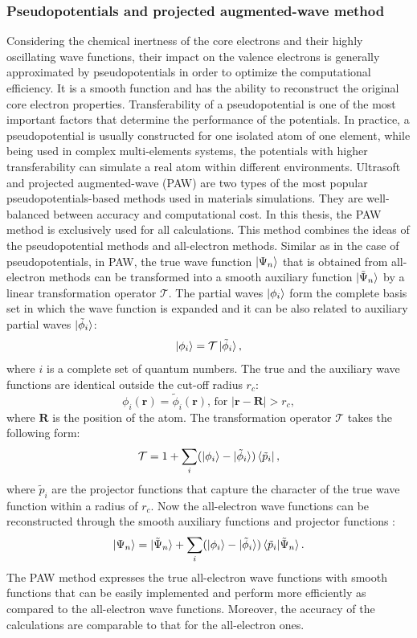 \subsubsection{Pseudopotentials and projected augmented-wave method}
Considering the chemical inertness of the core electrons and their highly oscillating wave functions, their impact on the valence electrons is generally approximated by pseudopotentials in order to optimize the computational efficiency. It is a smooth function and has the ability to reconstruct the original core electron properties. Transferability of a pseudopotential is one of the most important factors that determine the performance of the potentials. In practice, a pseudopotential is usually constructed for one isolated atom of one element, while being used in complex multi-elements systems, the potentials with higher transferability can simulate a real atom within different environments. Ultrasoft \cite{Ultrasoft1} and projected augmented-wave (PAW) \cite{PAW1,Kresse1999} are two types of the most popular pseudopotentials-based methods used in materials simulations. They are well-balanced between accuracy and computational cost. In this thesis, the PAW method is exclusively used for all calculations. This method combines the ideas of the pseudopotential methods and all-electron methods. Similar as in the case of pseudopotentials, in PAW, the true wave function $\ket{\Psi_n}$ that is obtained from all-electron methods can be transformed into a smooth auxiliary function $\ket{\tilde{\Psi}_n}$ by a linear transformation operator $\mathcal{T}$. The partial waves $\ket{\phi_i}$ form the complete basis set in which the wave function is expanded and it can be also related to auxiliary partial waves $\ket{\tilde{\phi}_i}$:
\begin{equation}
\ket{\phi_i}=\mathcal{T}\ket{\tilde{\phi}_i},
\end{equation}
where $i$ is a complete set of quantum numbers. The true and the auxiliary wave functions are identical outside the cut-off radius $r_c$:
\begin{equation}
\phi_i(\mathbf{r})=\tilde{\phi}_i(\mathbf{r})\text{, for }|\mathbf{r}-\mathbf{R}|>r_c,
\end{equation}
where $\mathbf{R}$ is the position of the atom. The transformation operator $\mathcal{T}$ takes the following form:
\begin{equation}
\mathcal{T}=1+\sum_i(\ket{\phi_i}-\ket{\tilde{\phi}_i})\bra{\tilde{p}_i},
\end{equation}
where $\tilde{p}_i$ are the projector functions that capture the character of the true wave function within a radius of $r_c$. Now the all-electron wave functions can be reconstructed through the smooth auxiliary functions and projector functions :
\begin{equation}
\ket{\Psi_n}=\ket{\tilde{\Psi}_n}+\sum_i(\ket{\phi_i}-\ket{\tilde{\phi}_i})\braket{\tilde{p}_i|\tilde{\Psi}_n}.
\end{equation}
The PAW method expresses the true all-electron wave functions with smooth functions that can be easily implemented and perform more efficiently as compared to the all-electron wave functions. Moreover, the accuracy of the calculations are comparable to that for the all-electron ones.
